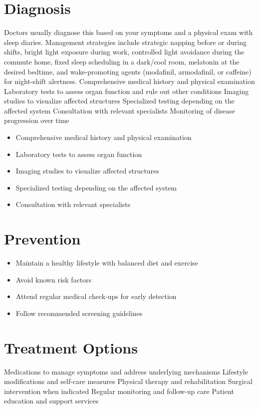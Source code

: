 \section{Diagnosis}
Doctors usually diagnose this based on your symptoms and a physical exam with sleep diaries. Management strategies include strategic napping before or during shifts, bright light exposure during work, controlled light avoidance during the commute home, fixed sleep scheduling in a dark/cool room, melatonin at the desired bedtime, and wake-promoting agents (modafinil, armodafinil, or caffeine) for night-shift alertness. Comprehensive medical history and physical examination Laboratory tests to assess organ function and rule out other conditions Imaging studies to visualize affected structures Specialized testing depending on the affected system Consultation with relevant specialists Monitoring of disease progression over time

\begin{itemize}[noitemsep]
  \item Comprehensive medical history and physical examination
  \item Laboratory tests to assess organ function
  \item Imaging studies to visualize affected structures
  \item Specialized testing depending on the affected system
  \item Consultation with relevant specialists
\end{itemize}
\section{Prevention}
\begin{itemize}[noitemsep]
  \item Maintain a healthy lifestyle with balanced diet and exercise
  \item Avoid known risk factors
  \item Attend regular medical check-ups for early detection
  \item Follow recommended screening guidelines
\end{itemize}
\section{Treatment Options}
Medications to manage symptoms and address underlying mechanisms Lifestyle modifications and self-care measures Physical therapy and rehabilitation Surgical intervention when indicated Regular monitoring and follow-up care Patient education and support services

